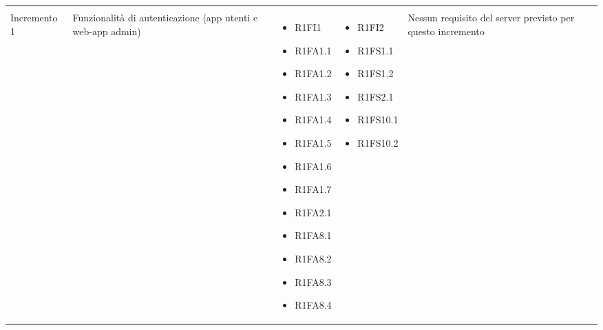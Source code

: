 {\begin{longtable}{C{2.5cm} C{3.2cm} C{2.8cm} C{2.8cm} C{2.8cm}}
\begin{itemize}
\end{itemize}\\

Incremento 1 & Funzionalità di autenticazione (app utenti e web-app admin) & \begin{itemize}
    \item[ ] R1FI1
    \item[ ] R1FA1.1
    \item[ ] R1FA1.2
    \item[ ] R1FA1.3
    \item[ ] R1FA1.4
    \item[ ] R1FA1.5
    \item[ ] R1FA1.6
    \item[ ] R1FA1.7
    \item[ ] R1FA2.1
    \item[ ] R1FA8.1
    \item[ ] R1FA8.2
    \item[ ] R1FA8.3
    \item[ ] R1FA8.4
\end{itemize} & \begin{itemize}
    \item[ ] R1FI2
    \item[ ] R1FS1.1
    \item[ ] R1FS1.2
    \item[ ] R1FS2.1
    \item[ ] R1FS10.1
    \item[ ] R1FS10.2
\end{itemize} & 
    Nessun requisito del server previsto per questo incremento \\


\end{longtable}}
